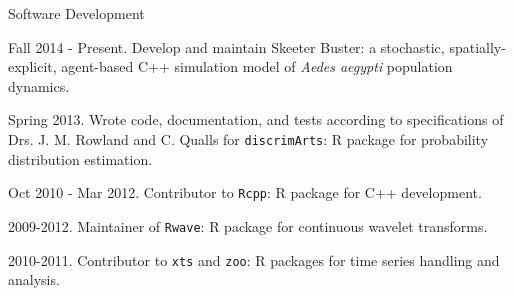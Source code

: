 \documentclass{resume} %
\begin{document}
\begin{rSection}{Software Development}
\item Fall 2014 - Present. Develop and maintain Skeeter Buster: a stochastic,
spatially-explicit, agent-based C++ simulation model of {\em Aedes aegypti}
population dynamics.
\item Spring 2013. Wrote code, documentation, and tests according to
specifications of Drs. J. M. Rowland and C. Qualls for \texttt{discrimArts}: R package for probability
distribution estimation.
\item Oct 2010 - Mar 2012. Contributor to \texttt{Rcpp}: R package for C++ development.
\item 2009-2012. Maintainer of \texttt{Rwave}: R package for continuous wavelet transforms.
\item 2010-2011. Contributor to \texttt{xts} and \texttt{zoo}: R packages for time series handling and analysis.
\end{rSection}




\end{document}
